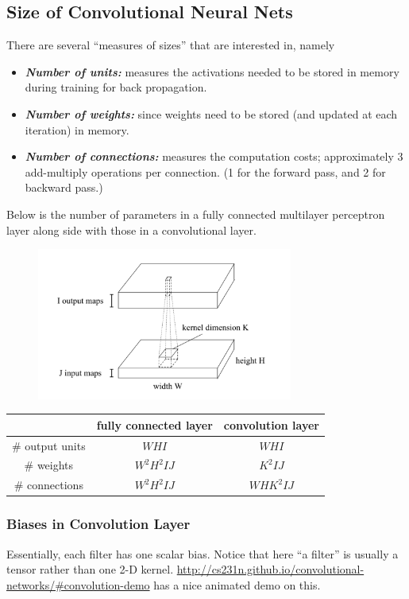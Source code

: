 \documentclass[11pt]{article}
\begin{document}
\subsection{Size of Convolutional Neural Nets}
There are several ``measures of sizes'' that are interested in, namely
\begin{itemize}
    \item \textit{\textbf{Number of units:}} measures the activations needed to be stored in memory during training for back propagation.
    \item \textit{\textbf{Number of weights:}} since weights need to be stored (and updated at each iteration) in memory. 
    \item \textit{\textbf{Number of connections:}} measures the computation costs; approximately 3 add-multiply operations per connection. (1 for the forward pass, and 2 for backward pass.)
\end{itemize}
Below is the number of parameters in a fully connected multilayer perceptron layer along side with those in a convolutional layer. \cite{convNetSize}
\begin{figure}[H]
    \center\includegraphics[width=0.75\textwidth]{img/size_conv_net}
\end{figure}
\begin{center}
    \begin{tabular}{c||c|c|}
        & fully connected layer & convolution layer \\
        \hline \hline
        \# output units & $WHI$ & $WHI$ \\
        \hline 
        \# weights & $W^2H^2IJ$ & $K^2IJ$ \\
        \hline
        \# connections & $W^2H^2IJ$ & $WHK^2IJ$ \\
        \hline
    \end{tabular}
\end{center}
\subsubsection{Biases in Convolution Layer}
Essentially, each filter has one scalar bias. Notice that here ``a filter'' is usually a tensor rather than one 2-D kernel. \url{http://cs231n.github.io/convolutional-networks/#convolution-demo} has a nice animated demo on this. 
\end{document}
